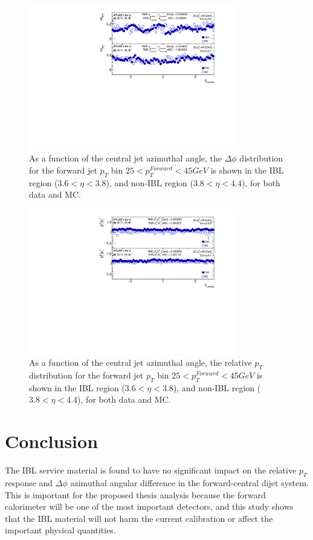 \begin{figure}
	\centering
	\includegraphics[width=0.8\textwidth]{figures/qualification/mcDataDPhi.pdf}
	\caption{As a function of the central jet azimuthal angle, the $\Delta\phi$ distribution for the forward jet $p_{T}$ bin $25<p_{T}^{Forward}<45 GeV$ is shown in the IBL region ($3.6<\eta<3.8$), and non-IBL region ($3.8<\eta<4.4$), for both data and MC.}
	\label{fig:mcdatadphi}
\end{figure}

\begin{figure}
	\centering
	\includegraphics[width=0.8\textwidth]{figures/qualification/mcDataRPt.pdf}
	\caption{As a function of the central jet azimuthal angle, the relative $p_{T}$ distribution for the forward jet $p_{T}$ bin $25<p_{T}^{Forward}<45 GeV$ is shown in the IBL region ($3.6<\eta<3.8$), and non-IBL region ($3.8<\eta<4.4$), for both data and MC.}
	\label{fig:mcdatarpt}
\end{figure}

\section{Conclusion}

The IBL service material is found to have no significant impact on the relative $p_{T}$ response and $\Delta\phi$ azimuthal angular difference in the forward-central dijet system. This is important for the proposed thesis analysis because the forward calorimeter will be one of the most important detectors, and this study shows that the IBL material will not harm the current calibration or affect the important physical quantities. 

